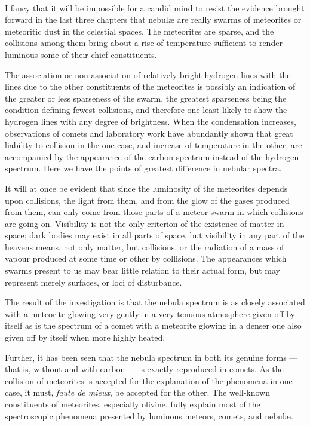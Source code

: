 \documentclass[a4paper, 12pt, oneside, polutonikogreek, english]{article}
\begin{document}
\paragraph{}
I fancy that it will be impossible for a candid mind to resist the evidence brought forward in the last three chapters that nebulæ are really swarms of meteorites or meteoritic dust in the celestial spaces. The meteorites are sparse, and the collisions among them bring about a rise of temperature sufficient to render luminous some of their chief constituents.

The association or non-association of relatively bright hydrogen lines with the lines due to the other constituents of the meteorites is possibly an indication of the greater or less sparseness of the swarm, the greatest sparseness being the condition defining fewest collisions, and therefore one least likely to show the hydrogen lines with any degree of brightness. When the condensation increases, observations of comets and laboratory work have abundantly shown that great liability to collision in the one case, and increase of temperature in the other, are accompanied by the appearance of the carbon spectrum instead of the hydrogen spectrum. Here we have the points of greatest difference in nebular spectra.

It will at once be evident that since the luminosity of the meteorites depends upon collisions, the light from them, and from the glow of the gases produced from them, can only come from those parts of a meteor swarm in which collisions are going on. Visibility is not the only criterion of the existence of matter in space; dark bodies may exist in all parts of space, but visibility in any part of the heavens means, not only matter, but collisions, or the radiation of a mass of vapour produced at some time or other by collisions. The appearances which swarms present to us may bear little relation to their actual form, but may represent merely surfaces, or loci of disturbance.

The result of the investigation is that the nebula spectrum is as closely associated with a meteorite glowing very gently in a very tenuous atmosphere given off by itself as is the spectrum of a comet with a meteorite glowing in a denser one also given off by itself when more highly heated.

Further, it has been seen that the nebula spectrum in both its genuine forms --- that is, without and with carbon --- is exactly reproduced in comets. As the collision of meteorites is accepted for the explanation of the phenomena in one case, it must, \emph{faute de mieux}, be accepted for the other. The well-known constituents of meteorites, especially olivine, fully explain most of the spectroscopic phenomena presented by luminous meteors, comets, and nebulæ.
\end{document}
